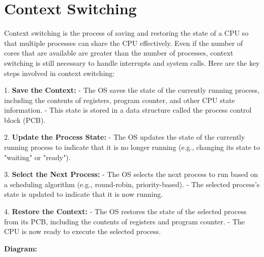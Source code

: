 \documentclass{report}
\begin{document}
\section{Context Switching}

Context switching is the process of saving and restoring the state of a CPU so that multiple processes can share the CPU effectively. Even if the number of cores that are available are
greater than the number of processes, context switching is still necessary to handle interrupts and system calls. Here are the key steps involved in context switching:

1. \textbf{Save the Context:}
- The OS saves the state of the currently running process, including the contents of registers, program counter, and other CPU state information.
- This state is stored in a data structure called the process control block (PCB).

2. \textbf{Update the Process State:}
- The OS updates the state of the currently running process to indicate that it is no longer running (e.g., changing its state to "waiting" or "ready").

3. \textbf{Select the Next Process:}
- The OS selects the next process to run based on a scheduling algorithm (e.g., round-robin, priority-based).
- The selected process's state is updated to indicate that it is now running.

4. \textbf{Restore the Context:}
- The OS restores the state of the selected process from its PCB, including the contents of registers and program counter.
- The CPU is now ready to execute the selected process.

\textbf{Diagram:}

\begin{center}
\end{center}
\end{document}
